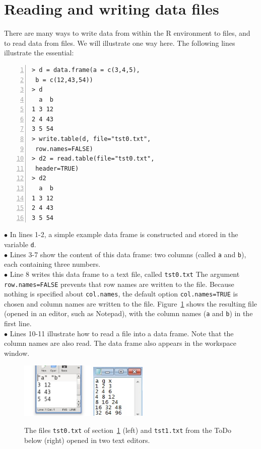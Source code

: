 \documentclass[a4paper,11pt,twocolumn,tablecaptionabove]{scrartcl}
\begin{document}
\section{Reading and writing data files}
\label{sec:reading-writing-data}

There are many ways to write data from within the R environment to files, and to read data from files. We will illustrate one way here. The following lines illustrate the essential:

\begin{Verbatim}[frame=single,numbers=left,gobble=0, xleftmargin=0.35cm, numbersep=0.1cm]
> d = data.frame(a = c(3,4,5), 
 b = c(12,43,54))
> d
  a  b
1 3 12
2 4 43
3 5 54
> write.table(d, file="tst0.txt",
 row.names=FALSE)
> d2 = read.table(file="tst0.txt", 
 header=TRUE)
> d2
  a  b
1 3 12
2 4 43
3 5 54
\end{Verbatim}
\noindent $\bullet$ In lines 1-2, a simple example data frame is constructed and stored in the
variable \texttt{d}. \\
\noindent $\bullet$ Lines 3-7 show the content of this data frame: two columns (called \texttt{a} and \texttt{b}), each containing three numbers.\\
\noindent $\bullet$ Line 8 writes this data frame to a text file, called \texttt{tst0.txt} The argument
\verb!row.names=FALSE! prevents that row names are written to the file. Because nothing is specified about \texttt{col.names}, the default option \verb!col.names=TRUE! is chosen
and column names are written to the file. Figure~\ref{fig:tst0}
shows the resulting file (opened in an editor, such as Notepad), with the
column names (\texttt{a} and \texttt{b}) in the first line. \\
\noindent $\bullet$ Lines 10-11 illustrate how to read a file into a data frame. Note that the column names are also read. The data frame also appears in the workspace window.\\

\begin{figure}[h]
  \centering
  \includegraphics[width=3.5cm]{img/tst0.jpeg}
  \includegraphics[width=2.6cm]{img/tst1.jpg}
  \caption{The files \texttt{tst0.txt} of section~\ref{sec:reading-writing-data}
    (left) and \texttt{tst1.txt} from the ToDo below (right) opened in two text editors.}
  \label{fig:tst0}
\end{figure}
\end{document}
